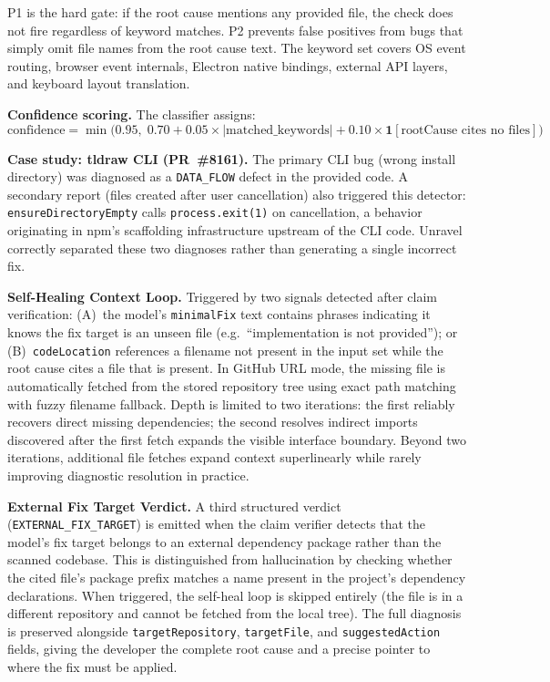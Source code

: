 \documentclass[12pt,a4paper]{article}
\newcommand{\code}[1]{\texttt{\small #1}}
\begin{document}
P1 is the hard gate: if the root cause mentions any provided file, the check does not fire
regardless of keyword matches. P2 prevents false positives from bugs that simply omit file
names from the root cause text. The keyword set covers OS event routing, browser event
internals, Electron native bindings, external API layers, and keyboard layout translation.

\textbf{Confidence scoring.} The classifier assigns:
\[
  \text{confidence} = \min\!\bigl(0.95,\; 0.70 + 0.05 \times |\text{matched\_keywords}|
  + 0.10 \times \mathbf{1}[\text{rootCause cites no files}]\bigr)
\]

\textbf{Case study: tldraw CLI (PR~\#8161).} The primary CLI bug (wrong install directory)
was diagnosed as a \code{DATA\_FLOW} defect in the provided code. A secondary report
(files created after user cancellation) also triggered this detector: \code{ensureDirectoryEmpty}
calls \code{process.exit(1)} on cancellation, a behavior originating in npm's scaffolding
infrastructure upstream of the CLI code. Unravel correctly separated these two diagnoses
rather than generating a single incorrect fix.

\textbf{Self-Healing Context Loop.} Triggered by two signals detected after claim
verification: (A)~the model's \code{minimalFix} text contains phrases indicating it knows
the fix target is an unseen file (e.g.\ ``implementation is not provided''); or (B)~\code{codeLocation}
references a filename not present in the input set while the root cause cites a file that
is present. In GitHub URL mode, the missing file is automatically fetched from the stored
repository tree using exact path matching with fuzzy filename fallback. Depth is limited
to two iterations: the first reliably recovers direct missing dependencies; the second
resolves indirect imports discovered after the first fetch expands the visible interface
boundary. Beyond two iterations, additional file fetches expand context superlinearly while
rarely improving diagnostic resolution in practice.

\textbf{External Fix Target Verdict.} A third structured verdict (\code{EXTERNAL\_FIX\_TARGET})
is emitted when the claim verifier detects that the model's fix target belongs to an
external dependency package rather than the scanned codebase. This is distinguished from
hallucination by checking whether the cited file's package prefix matches a name present
in the project's dependency declarations. When triggered, the self-heal loop is skipped
entirely (the file is in a different repository and cannot be fetched from the local tree).
The full diagnosis is preserved alongside \code{targetRepository}, \code{targetFile},
and \code{suggestedAction} fields, giving the developer the complete root cause and a
precise pointer to where the fix must be applied.
\end{document}
